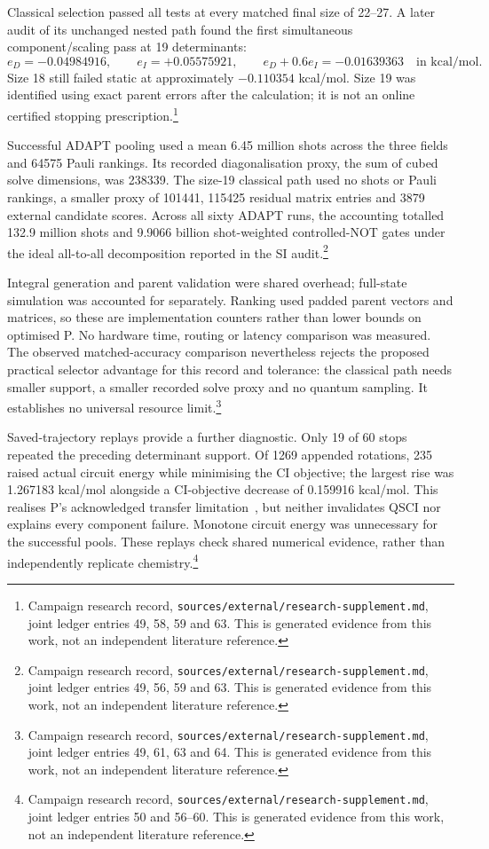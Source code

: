 \documentclass{article}
\newcommand{\record}[1]{\footnote{Campaign research record, \texttt{sources/external/research-supplement.md}, #1. This is generated evidence from this work, not an independent literature reference.}}
\begin{document}
Classical selection passed all tests at every matched final size of 22--27. A later audit of its unchanged nested path found the first simultaneous component/scaling pass at 19 determinants:
\[
 e_D=-0.04984916,\qquad e_I=+0.05575921,\qquad
 e_D+0.6e_I=-0.01639363
 \quad\text{in kcal/mol}.
\]
Size 18 still failed static at approximately \(-0.110354\) kcal/mol. Size 19 was identified using exact parent errors after the calculation; it is not an online certified stopping prescription.\record{joint ledger entries 49, 58, 59 and 63}

Successful ADAPT pooling used a mean 6.45 million shots across the three fields and 64575 Pauli rankings. Its recorded diagonalisation proxy, the sum of cubed solve dimensions, was 238339. The size-19 classical path used no shots or Pauli rankings, a smaller proxy of 101441, 115425 residual matrix entries and 3879 external candidate scores. Across all sixty ADAPT runs, the accounting totalled 132.9 million shots and 9.9066 billion shot-weighted controlled-NOT gates under the ideal all-to-all decomposition reported in the SI audit.\record{joint ledger entries 49, 56, 59 and 63}

Integral generation and parent validation were shared overhead; full-state simulation was accounted for separately. Ranking used padded parent vectors and matrices, so these are implementation counters rather than lower bounds on optimised P. No hardware time, routing or latency comparison was measured. The observed matched-accuracy comparison nevertheless rejects the proposed practical selector advantage for this record and tolerance: the classical path needs smaller support, a smaller recorded solve proxy and no quantum sampling. It establishes no universal resource limit.\record{joint ledger entries 49, 61, 63 and 64}

Saved-trajectory replays provide a further diagnostic. Only 19 of 60 stops repeated the preceding determinant support. Of 1269 appended rotations, 235 raised actual circuit energy while minimising the CI objective; the largest rise was 1.267183 kcal/mol alongside a CI-objective decrease of 0.159916 kcal/mol. This realises P's acknowledged transfer limitation~\cite{P}, but neither invalidates QSCI nor explains every component failure. Monotone circuit energy was unnecessary for the successful pools. These replays check shared numerical evidence, rather than independently replicate chemistry.\record{joint ledger entries 50 and 56--60}
\end{document}
